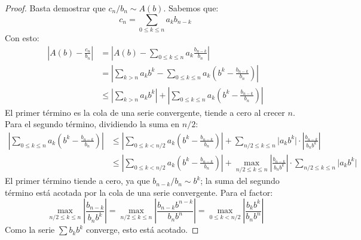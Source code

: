   \begin{proof}
    Basta demostrar que \(c_n / b_n \sim A(b)\).
    Sabemos que:
    \begin{equation*}
      c_n
	= \sum_{0 \le k \le n} a_k b_{n - k}
    \end{equation*}
    Con esto:
    \begin{align*}
      \left\lvert A(b) - \frac{c_n}{b_n} \right\rvert
	&=   \left\lvert
	       A(b)
		 - \sum_{0 \le k \le n} a_k \frac{b_{n - k}}{b_n}
	     \right\rvert \\
	&=   \left\lvert
	       \sum_{k > n} a_k b^k
		 - \sum_{0 \le k \le n}
		     a_k \left( b^k - \frac{b_{n - k}}{b_n} \right)
	      \right\rvert \\
	&\le \left\lvert
	       \sum_{k > n} a_k b^k
	      \right\rvert
		+ \left\lvert
		    \sum_{0 \le k \le n}
		      a_k \left( b^k - \frac{b_{n - k}}{b_n} \right)
		  \right\rvert
    \end{align*}
    El primer término es la cola de una serie convergente,
    tiende a cero al crecer \(n\).
    Para el segundo término,
    dividiendo la suma en \(n/2\):
    \begin{align*}
      \left\lvert
	\sum_{0 \le k \le n}
	  a_k \left( b^k - \frac{b_{n - k}}{b_n} \right)
      \right\rvert
	&\le \left\lvert
	       \sum_{0 \le k < n /2}
		 a_k \left( b^k - \frac{b_{n - k}}{b_n} \right)
	     \right\rvert
	       + \sum_{n/2 \le k \le n}
		   \lvert a_k b^k \rvert
		     \cdot \left\lvert
			     \frac{b_{n - k}}{b_n b^k}
			   \right\rvert \\
	&\le \left\lvert
	       \sum_{0 \le k < n /2}
		 a_k \left( b^k - \frac{b_{n - k}}{b_n} \right)
	     \right\rvert
	       + \max_{n/2 \le k \le n}
		   \left\lvert
		     \frac{b_{n - k}}{b_n b^k}
		   \right\rvert
		   \cdot \sum_{n/2 \le k \le n}
			   \lvert a_k b^k \rvert
    \end{align*}
    El primer término tiende a cero,
    ya que \(b_{n - k} / b_n \sim b^k\);
    la suma del segundo término
    está acotada por la cola de una serie convergente.
    Para el factor:
    \begin{equation*}
      \max_{n/2 \le k \le n}
	\left\lvert
	  \frac{b_{n - k}}{b_n b^k}
	\right\rvert
	  = \max_{n/2 \le k \le n}
	      \left\lvert
		\frac{b_{n - k} b^{n - k}}{b_n b^n}
	      \right\rvert
	  = \max_{0 \le k < n/2}
	      \left\lvert
		\frac{b_k b^k}{b_n b^n}
	      \right\rvert
    \end{equation*}
    Como la serie \(\sum b_k b^k\) converge,
    esto está acotado.
  \end{proof}
